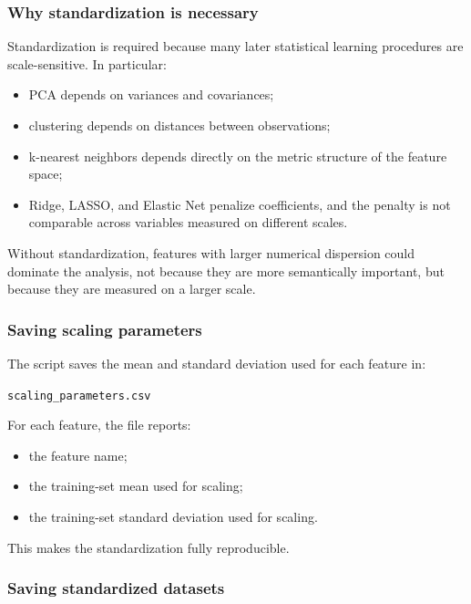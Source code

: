 \documentclass{ipgpmaster}
\begin{document}
\subsubsection{Why standardization is necessary}

Standardization is required because many later statistical learning procedures are scale-sensitive. In particular:

\begin{itemize}
    \item PCA depends on variances and covariances;
    \item clustering depends on distances between observations;
    \item k-nearest neighbors depends directly on the metric structure of the feature space;
    \item Ridge, LASSO, and Elastic Net penalize coefficients, and the penalty is not comparable across variables measured on different scales.
\end{itemize}

Without standardization, features with larger numerical dispersion could dominate the analysis, not because they are more semantically important, but because they are measured on a larger scale.

\subsubsection{Saving scaling parameters}

The script saves the mean and standard deviation used for each feature in:

\begin{center}
\texttt{scaling\_parameters.csv}
\end{center}

For each feature, the file reports:

\begin{itemize}
    \item the feature name;
    \item the training-set mean used for scaling;
    \item the training-set standard deviation used for scaling.
\end{itemize}

This makes the standardization fully reproducible.

\subsubsection{Saving standardized datasets}
\end{document}
